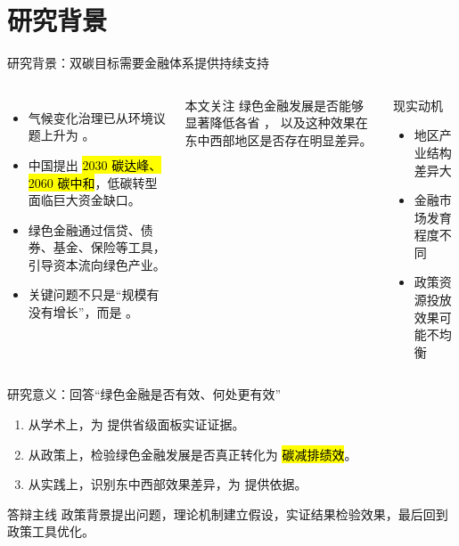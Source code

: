 \section{研究背景}

\begin{frame}{研究背景：双碳目标需要金融体系提供持续支持}
  \begin{columns}[T,onlytextwidth]
    \begin{itemize}
      \item 气候变化治理已从环境议题上升为 。
      \item 中国提出 \hl{2030 碳达峰、2060 碳中和}，低碳转型面临巨大资金缺口。
      \item 绿色金融通过信贷、债券、基金、保险等工具，引导资本流向绿色产业。
      \item 关键问题不只是“规模有没有增长”，而是 。
    \end{itemize}

    \begin{block}{本文关注}
      绿色金融发展是否能够显著降低各省 ，
      以及这种效果在东中西部地区是否存在明显差异。
    \end{block}

    \begin{exampleblock}{现实动机}
      \begin{itemize}
        \item 地区产业结构差异大
        \item 金融市场发育程度不同
        \item 政策资源投放效果可能不均衡
      \end{itemize}
    \end{exampleblock}
  \end{columns}
\end{frame}

\begin{frame}{研究意义：回答“绿色金融是否有效、何处更有效”}
  \begin{enumerate}
    \item 从学术上，为  提供省级面板实证证据。
    \item 从政策上，检验绿色金融发展是否真正转化为 \hl{碳减排绩效}。
    \item 从实践上，识别东中西部效果差异，为  提供依据。
  \end{enumerate}

  \vspace{0.6em}
  \begin{alertblock}{答辩主线}
    政策背景提出问题，理论机制建立假设，实证结果检验效果，最后回到政策工具优化。
  \end{alertblock}
\end{frame}
